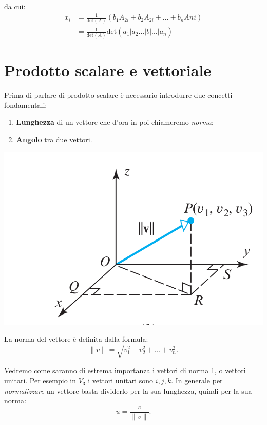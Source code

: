 \documentclass[x11names]{article}
\begin{document}
da cui: 
\begin{align*}
    x_i &= \frac{1}{\text{det}(A)}(b_1 A_{2i} + b_2  A_{2i} + \dots + b_nA{ni})  \\
   &= \frac{1}{\text{det}(A)} \text{det}(\overline{a}_1 | \overline{a}_2 \dots |\overline{b}| \dots |\overline{a}_n)
\end{align*}




\newpage
\section{Prodotto scalare e vettoriale}
Prima di parlare di prodotto scalare è necessario introdurre due concetti fondamentali:

\begin{enumerate}
	\item \textbf{Lunghezza} di un vettore che d'ora in poi chiameremo \textit{norma};
	\item \textbf{Angolo} tra due vettori.
\end{enumerate}

\begin{center}
\includegraphics[scale=0.2]{figures/norma.png}
\end{center}

La norma del vettore è definita dalla formula:
\[
\|v\| = \sqrt{v_1^2 + v_2^2 + \dots + v_{n}^2}
.\] 

Vedremo come saranno di estrema importanza i vettori di norma 1, o vettori unitari. Per esempio in $V_3$ i vettori unitari sono $i,j,k$. In generale per \textit{normalizzare} un vettore basta dividerlo per la sua lunghezza, quindi per la sua norma:
\[
u = \frac{v}{\|v\|}
.\] 
\end{document}
